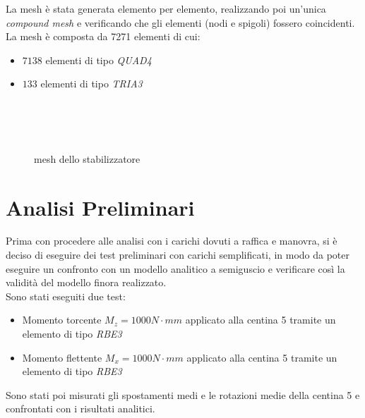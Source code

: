 \documentclass[
10pt, %
a4paper, %
oneside, %
headinclude,footinclude, %
BCOR5mm, %
]{scrartcl}
\begin{document}
La mesh è stata generata elemento per elemento, realizzando poi un'unica \emph{compound mesh} e verificando che gli elementi (nodi e spigoli) fossero coincidenti.
La mesh è composta da 7271 elementi di cui:

\begin{itemize}
	\item $7138$ elementi di tipo \emph{QUAD4}
	\item $133$ elementi di tipo \emph{TRIA3}
\end{itemize} 

\begin{figure}[htb]
	\centering
	 \\
	 \\
	 \\
	\caption[Mesh Stabilizzatore SF260]{mesh dello stabilizzatore} %
	\label{fig:mesh}
\end{figure}


\newpage


\section{Analisi Preliminari}

Prima con procedere alle analisi con i carichi dovuti a raffica e manovra, si è deciso di eseguire dei test preliminari con carichi semplificati, in modo da poter eseguire un confronto con un modello analitico a semiguscio e verificare così la validità del modello finora realizzato.\\
Sono stati eseguiti due test:

\begin{itemize}
	\item Momento torcente $M_z = 1000 N \cdot mm$ applicato alla centina 5 tramite un elemento di tipo \emph{RBE3}	
	\item Momento flettente $M_x = 1000 N \cdot mm$ applicato alla centina 5 tramite un elemento di tipo \emph{RBE3}
\end{itemize}

Sono stati poi misurati gli spostamenti medi e le rotazioni medie della centina 5 e confrontati con i risultati analitici.
\end{document}
